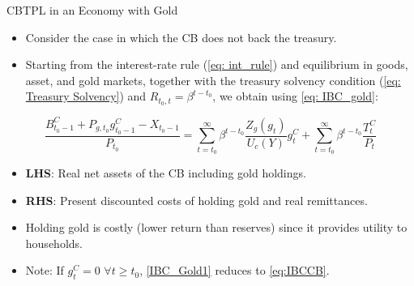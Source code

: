 \documentclass[11pt,aspectratio=169]{beamer}
\begin{document}
\begin{frame}{CBTPL in an Economy with Gold}
\small
\begin{itemize}
\item Consider the case in which the CB does not back the treasury.
    \item Starting from the interest-rate rule (\ref{eq: int_rule}) and equilibrium in goods, asset, and gold markets, together with the treasury solvency condition (\ref{eq: Treasury Solvency}) and $R_{t_0,t} = \beta^{t-t_0}$, we obtain using \eqref{eq: IBC_gold}:
\end{itemize}

\begin{equation}
\frac{B_{t_0-1}^{C}+P_{g,t_0} g_{t_0-1}^{C}-X_{t_0-1}}{P_{t_0}} =
\sum_{t=t_0}^{\infty} \beta^{t-t_0} \frac{Z_g(g_t)}{U_c(Y)} g_t^C +
\sum_{t=t_0}^{\infty} \beta^{t-t_0} \frac{T_t^C}{P_t} 
\label{IBC_Gold1}
\end{equation}

\begin{itemize}
    \item \textbf{LHS}: Real net assets of the CB including gold holdings.  
    \item \textbf{RHS}: Present discounted costs of holding gold and real remittances.  
    \item Holding gold is costly (lower return than reserves) since it provides utility to households.  
    \item Note: If $g_t^C = 0$ $\forall t \ge t_0$, \eqref{IBC_Gold1} reduces to \eqref{eq:IBCCB}.
\end{itemize}
\end{frame}
\end{document}
